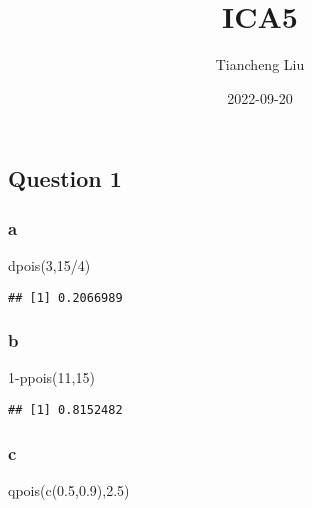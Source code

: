 \documentclass[
]{article}
\title{ICA5}
\author{Tiancheng Liu}
\date{2022-09-20}
\newenvironment{Shaded}{\begin{snugshade}}{\end{snugshade}}
\newcommand{\DecValTok}[1]{\textcolor[rgb]{0.00,0.00,0.81}{#1}}
\newcommand{\FloatTok}[1]{\textcolor[rgb]{0.00,0.00,0.81}{#1}}
\newcommand{\FunctionTok}[1]{\textcolor[rgb]{0.00,0.00,0.00}{#1}}
\newcommand{\NormalTok}[1]{#1}
\newcommand{\SpecialCharTok}[1]{\textcolor[rgb]{0.00,0.00,0.00}{#1}}
\begin{document}
\maketitle

{
\setcounter{tocdepth}{3}
\tableofcontents
}
\hypertarget{question-1}{%
\subsection{Question 1}\label{question-1}}

\hypertarget{a}{%
\subsubsection{a}\label{a}}

\begin{Shaded}
\begin{Highlighting}[]
\FunctionTok{dpois}\NormalTok{(}\DecValTok{3}\NormalTok{,}\DecValTok{15}\SpecialCharTok{/}\DecValTok{4}\NormalTok{)}
\end{Highlighting}
\end{Shaded}

\begin{verbatim}
## [1] 0.2066989
\end{verbatim}

\hypertarget{b}{%
\subsubsection{b}\label{b}}

\begin{Shaded}
\begin{Highlighting}[]
\DecValTok{1}\SpecialCharTok{{-}}\FunctionTok{ppois}\NormalTok{(}\DecValTok{11}\NormalTok{,}\DecValTok{15}\NormalTok{)}
\end{Highlighting}
\end{Shaded}

\begin{verbatim}
## [1] 0.8152482
\end{verbatim}

\hypertarget{c}{%
\subsubsection{c}\label{c}}

\begin{Shaded}
\begin{Highlighting}[]
\FunctionTok{qpois}\NormalTok{(}\FunctionTok{c}\NormalTok{(}\FloatTok{0.5}\NormalTok{,}\FloatTok{0.9}\NormalTok{),}\FloatTok{2.5}\NormalTok{)}
\end{Highlighting}
\end{Shaded}
\end{document}
